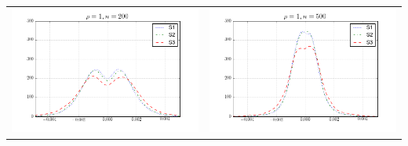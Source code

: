 \begin{table}[!ht]
{\begin{tabular}{c c}
\includegraphics[width=8cm]{density_200_1} & \includegraphics[width=8cm]{density_500_1} \\
\end{tabular}
}
\end{table}

